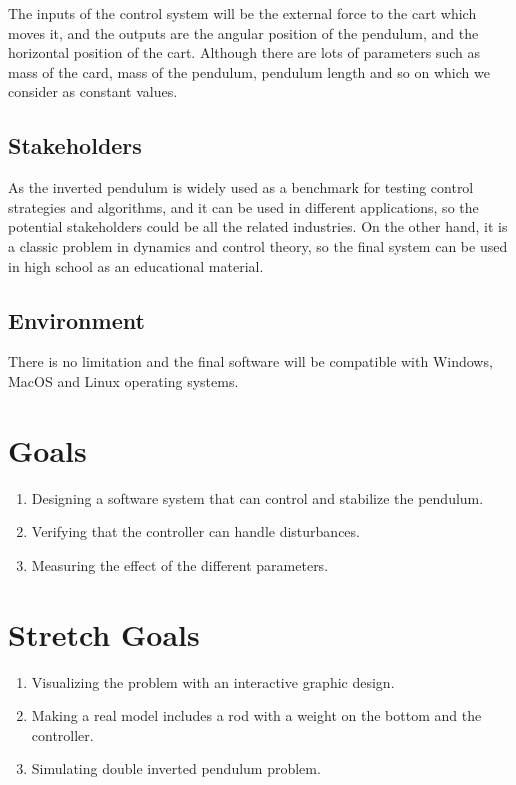 \documentclass{article}
\begin{document}
The inputs of the control system will be the external force to the cart which moves it, and the outputs are the angular position of the pendulum, and the horizontal position of the cart. Although there are lots of parameters such as mass of the card, mass of the pendulum, pendulum length and so on which we consider as constant values.

\subsection{Stakeholders}

As the inverted pendulum is widely used as a benchmark for testing control strategies and algorithms, and it can be used in different applications, so the potential stakeholders could be all the related industries. On the other hand, it is a classic problem in dynamics and control theory, so the final system can be used in high school as an educational material.

\subsection{Environment}

There is no limitation and the final software will be compatible with Windows, MacOS and Linux operating systems.

\section{Goals}

\begin{enumerate}
  \item	Designing a software system that can control and stabilize the pendulum.
  \item Verifying that the controller can handle disturbances.
  \item	Measuring the effect of the different parameters.
\end{enumerate}
\section{Stretch Goals}
\begin{enumerate}
  \item Visualizing the problem with an interactive graphic design.
  \item Making a real model includes a rod with a weight on the bottom and the controller.
  \item Simulating double inverted pendulum problem.
\end{enumerate}
\end{document}
